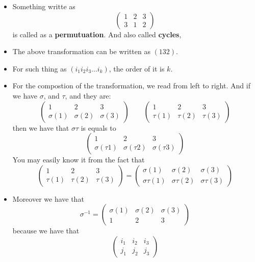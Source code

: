\documentclass[../main.tex]{subfiles}
\begin{document}
\begin{itemize}
	\item Something writte as
		\[
			\begin{pmatrix}
				1 & 2 & 3 \\ 
				3 & 1 & 2 
			\end{pmatrix}
		\]
		is called as a \textbf{permutuation}. And also called \textbf{cycles},
	\item The above transformation can be written as \((132)\).
	\item For such thing as \( ( i_{1}  i_{2} i _{3} \dots i _{k})\), the order of it is \(k\).
	\item For the compostion of the transformation, we read from left to right. 
		And if we have \(\sigma\), and \(\tau\), and they are: 
		\[
			\begin{pmatrix}
				1 & 2 & 3\\
				\sigma (1) & \sigma (2) & \sigma (3)
			\end{pmatrix}
			\qquad 
			\begin{pmatrix}
				1 & 2 & 3 \\ 
				\tau (1)  & \tau (2 ) &\tau (3)
			\end{pmatrix}
		\]
		then we have that 
		\(\sigma\tau\) is equals to 
		\[
			\begin{pmatrix}
				1 & 2 & 3 \\ 
				\sigma (\tau 1) &\sigma (\tau 2) &\sigma (\tau 3)
			\end{pmatrix}
		\]
		You may easily know it from the fact that 
		\[
			\begin{pmatrix}
				1 & 2 & 3 \\
				\tau (1) &\tau (2) &\tau (3)
			\end{pmatrix}
			= 
			\begin{pmatrix}
				\sigma (1) &\sigma (2) &\sigma (3) \\ 
				\sigma\tau (1) &\sigma\tau (2) &\sigma\tau (3)
			\end{pmatrix}
		\]
	\item 	
		Moreover we have that 
		\[
			\sigma ^{-1} = 
			\begin{pmatrix}
				\sigma (1) &\sigma (2) &\sigma (3) \\ 
				1 & 2 & 3 
			\end{pmatrix} 
		\]
		because we have that 
		\[
			\begin{pmatrix}
				i_{1} & i_{2} & i_{3} \\ 
				j_1 & j_2 & j_3 
			\end{pmatrix}
\]
\end{itemize}
\end{document}
